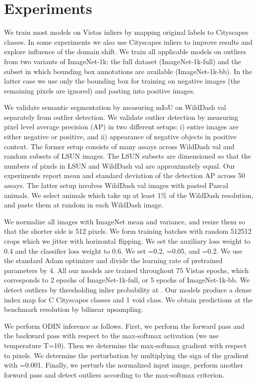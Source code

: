 \documentclass[runningheads]{llncs}
\begin{document}
\section{Experiments}

We train most models on  
Vistas inliers \cite{neuhold17iccv}
by mapping original labels 
to Citysca\-pes \cite{cordts15cvpr} classes.
In some experiments we also use 
Cityscapes inliers 
to improve results
and explore influence of the domain shift. 
We train all applicable models on outliers 
from two variants of ImageNet-1k: 
the full dataset (ImageNet-1k-full) 
and the subset in which
bounding box annotations
are available (ImageNet-1k-bb).
In the latter case
we use only the bounding box 
for training on negative images 
(the remaining pixels are ignored)
and pasting into positive images.


We validate semantic segmentation 
by measuring mIoU on WildDash val
separately from outlier detection. 
We validate outlier detection
by measuring pixel level 
average precision (AP) 
in two different setups:
i) entire images are either
negative or positive, and
ii) appearance of negative
objects in positive context.
The former setup consists of
many assays
across WildDash val and random
subsets of LSUN images.
The LSUN subsets are dimensioned so that
the numbers of pixels in LSUN and WildDash val
are approximately equal.
Our experiments report mean and standard deviation
of the detection AP across 50 assays.
The latter setup involves WildDash val images
with pasted Pascal animals.
We select animals which take up
at least 1\% of the WildDash resolution,
and paste them at random in each WildDash image.


We normalize all images 
with ImageNet mean and variance,
and resize them so that 
the shorter side is 512 pixels.
We form training batches 
with random 512512 crops
which we jitter with horizontal flipping.
We set the auxiliary loss weight to 0.4 
and the classifier loss weight to 0.6.
We set =0.2, 
=0.05,
and =0.2. 
We use the standard Adam optimizer 
and divide the learning rate 
of pretrained parameters by 4.
All our models are trained 
throughout 75 Vistas epochs,
which corresponds to 
2 epochs of ImageNet-1k-full,  
or 5 epochs of ImageNet-1k-bb.
We detect outliers by thresholding 
inlier probability at .
Our models produce a dense index map
for C Cityscapes classes and 1 void class.
We obtain predictions at 
the benchmark resolution 
by bilinear upsampling.

We perform ODIN inference as follows.
First, we perform the forward pass
and the backward pass with respect 
to the max-softmax activation
(we use temperature T=10).
Then we determine 
the max-softmax gradient 
with respect to pixels.
We determine the perturbation
by multiplying the sign of the gradient 
with =0.001. 
Finally, we perturb 
the normalized input image,
perform another forward pass
and detect outliers according 
to the max-softmax criterion.
\end{document}

